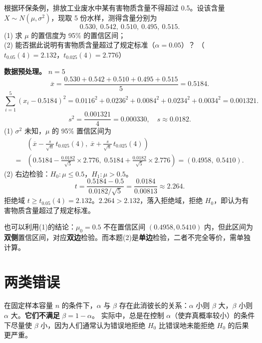 ﻿\documentclass[lang=cn,11pt]{elegantbook}
\begin{document}
\begin{exercise}[置信区间与假设检验的综合] \label{ex:ci_ht_01}
根据环保条例，排放工业废水中某有害物质含量不得超过 0.5。设该含量 \(X\sim N(\mu,\sigma^2)\)，现取 5 份水样，测得含量分别为
\[
0.530,\ 0.542,\ 0.510,\ 0.495,\ 0.515.
\]
(1) 求 \(\mu\) 的置信度为 95\% 的置信区间；\\
(2) 能否据此说明有害物质含量超过了规定标准（\(\alpha=0.05\)）？
（\(t_{0.05}(4)=2.132\)，\(t_{0.025}(4)=2.776\)）
\end{exercise}
\begin{solution}
\textbf{数据预处理。} \(n=5\)
\[
\overline{x}=\frac{0.530+0.542+0.510+0.495+0.515}{5}=0.5184.
\]
\[
\sum_{i=1}^{5}(x_i-0.5184)^2=0.0116^2+0.0236^2+0.0084^2+0.0234^2+0.0034^2=0.001321.
\]
\[
s^2=\frac{0.001321}{4}=0.000330,\quad s\approx 0.0182.
\]
(1) \(\sigma^2\) 未知，\(\mu\) 的 95\% 置信区间为
\begin{align*}
&\left(\overline{x}-\frac{s}{\sqrt{n}}\,t_{0.025}(4),\;\overline{x}+\frac{s}{\sqrt{n}}\,t_{0.025}(4)\right)\\
=&\left(0.5184-\frac{0.0182}{\sqrt{5}}\times2.776,\;0.5184+\frac{0.0182}{\sqrt{5}}\times2.776\right)=(0.4958,\;0.5410).
\end{align*}
(2) 右边检验：\(H_0\colon\mu\leq 0.5\)，\(H_1\colon\mu>0.5\)。
\[
t=\frac{0.5184-0.5}{0.0182/\sqrt{5}}=\frac{0.0184}{0.00813}\approx 2.264.
\]
拒绝域 \(t\geq t_{0.05}(4)=2.132\)。\(2.264>2.132\)，落入拒绝域，拒绝 \(H_0\)，即认为有害物质含量超过了规定标准。
\begin{note}
也可以利用(1)的结论：\(\mu_0=0.5\) 不在置信区间 \((0.4958,0.5410)\) 内，但此区间为\textbf{双侧}置信区间，对应\textbf{双边}检验。而本题(2)是\textbf{单边}检验，二者不完全等价，需单独计算。
\end{note}
\end{solution}


\section{两类错误}

\begin{note}
在固定样本容量 \(n\) 的条件下，\(\alpha\) 与 \(\beta\) 存在此消彼长的关系：\(\alpha\) 小则 \(\beta\) 大，\(\beta\) 小则 \(\alpha\) 大。\textbf{它们不满足} \(\beta=1-\alpha\)。
实际中，总是在控制 \(\alpha\)（使弃真概率较小）的条件下尽量使 \(\beta\) 小，因为人们通常认为错误地拒绝 \(H_0\) 比错误地未能拒绝 \(H_0\) 的后果更严重。
\end{note}
\end{document}
